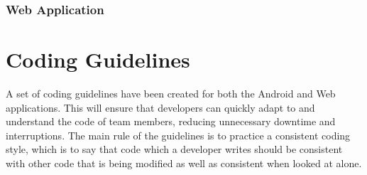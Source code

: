 \documentclass[11pt,a4paper]{article}
\begin{document}
\subsubsection{Web Application}

\section{Coding Guidelines}
A set of coding guidelines have been created for both the Android and Web applications. This will ensure that developers can quickly adapt to and understand the code of team members, reducing unnecessary downtime and interruptions. The main rule of the guidelines is to practice a consistent coding style, which is to say that code which a developer writes should be consistent with other code that is being modified as well as consistent when looked at alone.
\end{document}
